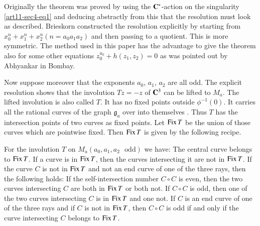 \begin{remark*}
Originally the theorem was proved by using the $\mathbf{C}^{*}$-action on the singularity \eqref{art11-sec4-eq1} and deducing abstractly from this that the resolution must look as described. Brieskorn constructed the resolution explicitly by starting from $x^{n}_{0}+x^{n}_{1}+x^{n}_{2}(n=a_{0}a_{1}a_{2})$ and then passing to a quotient. This is more symmetric. The method used in this paper has the advantage to give the theorem also for some other equations $z^{a_{0}}_{0}+h(z_{1},z_{2})=0$ as was pointed out by Abhyankar in Bombay.
\end{remark*}

Now suppose moreover that the exponents $a_{0}$, $a_{1}$, $a_{2}$ are all odd. The explicit resolution shows that the involution $Tz=-z$ of $\mathbf{C}^{3}$ can be lifted to $M_{a}$. The lifted involution is also called $T$. It has no fixed points outside $\phi^{-1}(0)$. It carries all the rational curves of the graph $\mathfrak{g}_{a}$ over into themselves \cite{art11-key7}. Thus $T$ has the intersection points of two curves as fixed points. Let $\operatorname{\mathrm{Fix}} T$ be the union of those curves which are pointwise fixed. Then $\operatorname{\mathrm{Fix}} T$ is given by the following recipe.

\begin{theorem*}
For the involution $T$ on $M_{a}(a_{0},a_{1},a_{2}\text{~ odd})$ we have: The central curve belongs to $\operatorname{\mathrm{Fix}} T$. If a curve is in $\operatorname{\mathrm{Fix}} T$, then the curves intersecting it are not in $\operatorname{\mathrm{Fix}} T$. If the curve $C$ is not in $\operatorname{\mathrm{Fix}} T$ and not an end curve of one of the three rays, then the following holds: If the self-intersection number $C\circ C$ is even, then the two curves intersecting $C$ are both in $\operatorname{\mathrm{Fix}} T$ or both not. If $C\circ C$ is odd, then one of the two curves intersecting $C$ is in $\operatorname{\mathrm{Fix}} T$ and one not. If $C$ is an end curve of one of the three rays and if $C$ is not in $\operatorname{\mathrm{Fix}} T$, then $C\circ C$ is odd if and only if the curve intersecting $C$ belongs to $\operatorname{\mathrm{Fix}} T$.
\end{theorem*}

